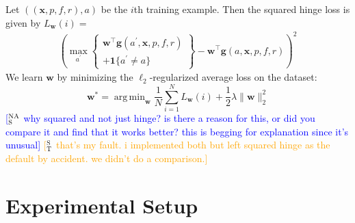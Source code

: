 \documentclass[11pt,a4paper]{article}
\newcommand{\indicator}[1]{I_{\{#1\}}} %
\DeclareMathOperator*{\argmax}{arg\,max}
\DeclareMathOperator*{\argmin}{arg\,min}
\newcommand{\ensuretext}[1]{#1}
\newcommand{\nssmarker}{\ensuretext{\textcolor{magenta}{\ensuremath{^{\textsc{NS}}_{\textsc{S}}}}}}
\newcommand{\stmarker}{\ensuretext{\textcolor{orange}{\ensuremath{^{\textsc{S}}_{\textsc{T}}}}}}
\newcommand{\nasmarker}{\ensuretext{\textcolor{blue}{\ensuremath{^{\textsc{NA}}_{\textsc{S}}}}}}
\newcommand{\arkcomment}[3]{\ensuretext{\textcolor{#3}{[#1 #2]}}}
\newcommand{\nss}[1]{\arkcomment{\nssmarker}{#1}{magenta}}
\newcommand{\st}[1]{\arkcomment{\stmarker}{#1}{orange}}
\newcommand{\nascomment}[1]{\arkcomment{\nasmarker}{#1}{blue}}
\begin{document}
% 

Let $((\mathbf{x}, p, f, r), a)$ %
be the $i$th training example.
Then the squared hinge loss is given by $L_{\mathbf{w}}(i) =$
\begin{align*}
\left(\max_{a^\prime} \left\{ \begin{array}{c} \mathbf{w}^\top \mathbf{g}(a^\prime, \mathbf{x}, p, f,
r) \\ + \boldsymbol{1}\{a^\prime \not = a\} \end{array}\right \} - 
  \mathbf{w}^\top \mathbf{g}(a, \mathbf{x}, p, f, r)\right)^2
\end{align*}
We learn $\mathbf{w}$ by minimizing the $\ell_2$-regularized average loss on the dataset:
\begin{equation}
\mathbf{w^*} = \argmin_\mathbf{w}{
    \frac{1}{N}\sum_{i = 1}^N L_{\mathbf{w}}(i) + \frac{1}{2} \lambda \| \mathbf{w} \|_2^2
}
\end{equation}
\nascomment{why squared and not just hinge?  is there a reason for
  this, or did you compare it and find that it works better?  this is
  begging for explanation since it's unusual}
\st{that's my fault. i implemented both but left squared hinge as the default
by accident. we didn't do a comparison.}

\section{Experimental Setup}
\end{document}
